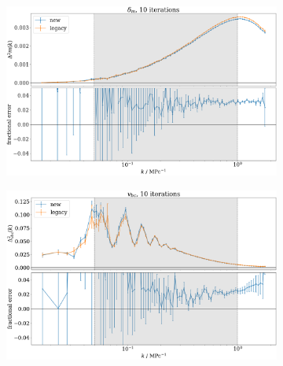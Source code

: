 \documentclass[floats,floatfix,showpacs,amssymb,prd,superscriptaddress,nofootinbib]{revtex4-2} %
\begin{document}
\newpage
\newpage
\begin{figure}[H]
     \centering
     \begin{subfigure}[b]{0.9\textwidth}
         \centering
         \includegraphics[width=\textwidth]{images/ic_power_spectra/compare_generators_averaged_power_spectra_with_residual_delta_m.png}
         \label{fig:compare_generators_power_spectrum_delta_m}
     \end{subfigure}
     \hfill
     \begin{subfigure}[b]{0.9\textwidth}
         \centering
         \includegraphics[width=\textwidth]{images/ic_power_spectra/compare_generators_averaged_power_spectra_with_residual_v_bc.png}
         \label{fig:compare_generators_power_spectrum_vbc}
     \end{subfigure}

\end{figure}
\end{document}
